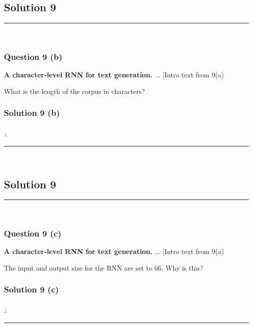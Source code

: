 \documentclass{article}
\begin{document}
\newpage

\subsection*{Solution 9}
\noindent\rule{\textwidth}{0.4pt}\\
\subsubsection*{Question 9 (b)}
\begin{flushleft}
    \textbf{A character-level RNN for text generation.} ... [Intro text from 9(a)  

    What is the length of the corpus in characters? 
\end{flushleft}

\subsubsection*{Solution 9 (b)}


\subsubsection*{\normalfont}{$\therefore$ }

\noindent\rule{\textwidth}{0.4pt}\\

\newpage

\subsection*{Solution 9}
\noindent\rule{\textwidth}{0.4pt}\\
\subsubsection*{Question 9 (c)}
\begin{flushleft}
    \textbf{A character-level RNN for text generation.} ... [Intro text from 9(a)  

    The input and output size for the RNN are set to 66. Why is this? 
\end{flushleft}

\subsubsection*{Solution 9 (c)}


\subsubsection*{\normalfont}{$\therefore$ }

\noindent\rule{\textwidth}{0.4pt}\\
\end{document}
